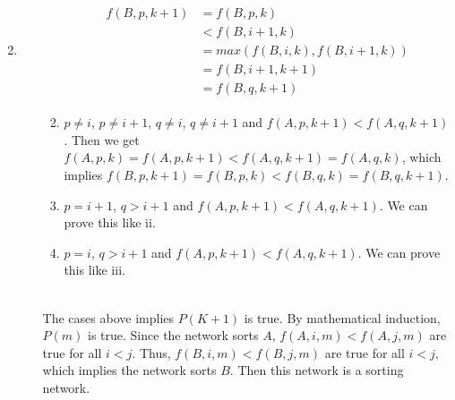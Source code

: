 \documentclass[12pt,a4paper]{article}
\makeatletter
\newtheorem*{solution}{Solution}
\theoremstyle{definition}
\renewenvironment{solution}[1][Solution] {\par\pushQED{\qed}\normalfont\topsep6\p@\@plus6\p@\relax\trivlist\item[\hskip\labelsep\bfseries#1\@addpunct{.}]\ignorespaces}{\popQED\endtrivlist\@endpefalse} \makeatother
\makeatother
\begin{document}
\begin{enumerate}
\begin{solution}
\begin{enumerate}
\begin{enumerate}
         \begin{align}
        \begin{split}
            f(B,p,k+1)&=f(B,p,k)\\
            &<f(B,i+1,k)\\ 
            &= max(f(B,i,k),f(B,i+1,k))\\ 
            &= f(B,i+1,k+1)\\
            &= f(B,q,k+1)
        \end{split}
        \end{align}
        \item $p\neq i$, $p\neq i+1$, $q\neq i$, $q \neq  i+1$ and $f(A,p,k+1)<f(A,q,k+1)$. Then we get $f(A,p,k)=f(A,p,k+1)<f(A,q,k+1)=f(A,q,k)$, which implies $f(B,p,k+1)=f(B,p,k)<f(B,q,k)=f(B,q,k+1)$.
        \item $p=i+1$, $q > i+1$ and $f(A,p,k+1)<f(A,q,k+1)$. We can prove this like ii.
        \item $p=i$, $q > i+1$ and $f(A,p,k+1)<f(A,q,k+1)$. We can prove this like iii.
    \end{enumerate}
    ~\\
    The cases above implies $P(K+1)$ is true. By mathematical induction, $P(m)$ is true. Since the network sorts $A$, $f(A,i,m)<f(A,j,m)$ are true for all $i<j$. Thus, $f(B,i,m)<f(B,j,m)$ are true for all $i<j$, which implies the network sorts $B$. Then this network is a sorting network.

\end{enumerate}
\end{solution}
\end{enumerate}
\end{document}
